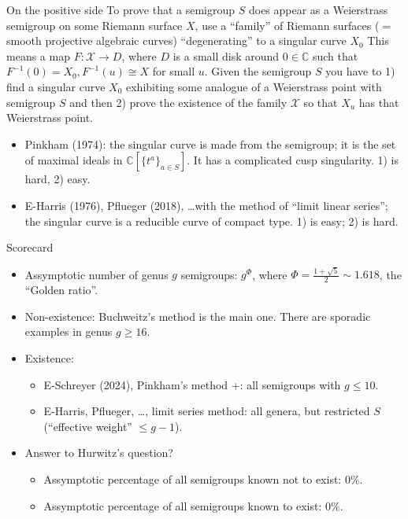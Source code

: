 \documentclass[12pt, aspectratio=169]{beamer}
\begin{document}
\def\C{{\mathbb C}}
\begin{frame}{On the positive side}
To prove that a semigroup $S$ does appear as a Weierstrass semigroup on some
Riemann surface $X$, use a ``family'' of
Riemann surfaces ($=$ smooth projective algebraic curves) ``degenerating'' to a singular curve $X_0$
This means a map $F: \mathcal X \to D$, where $D$ is a small disk around $0\in \C$ such
that $F^{-1}(0) = X_0, F^{-1}(u) \cong X$ for small $u$.
 Given the semigroup $S$ you
have to 1) find a singular curve $X_0$ exhibiting some analogue of a Weierstrass point with semigroup $S$
and then 2) prove the existence of the family $\mathcal X$ so that $X_u$ has that Weierstrass point.

\begin{itemize}
 \item Pinkham (1974): the singular curve is made from the semigroup; it is the set 
of maximal ideals in $\C[\{t^a\}_{a\in S}]$. It has a complicated cusp singularity. 1) is hard, 2) easy.

\item E-Harris (1976), Pflueger (2018), \dots with the method of ``limit linear series''; the singular curve is a reducible curve of compact type. 1) is easy; 2) is hard.
\end{itemize}
\end{frame}

\begin{frame}{Scorecard}\
\begin{itemize}
\item<1-> Assymptotic number of genus $g$ semigroups: $g^\Phi$, where $\Phi = \frac{1+\sqrt 5}{2}\sim 1.618$, the ``Golden ratio''.
 \item<2-> Non-existence: Buchweitz's method is the main one. There are sporadic examples in genus $g \geq 16$.
 \item<3-> Existence: 
\begin{itemize}
 \item<4-> E-Schreyer (2024), Pinkham's method +: all semigroups with $g\leq 10$.
 \item<4-> E-Harris, Pflueger, \dots, limit series method: all genera, but restricted $S$ (``effective weight'' $\leq g-1$).
\end{itemize}
\item<5-> Answer to Hurwitz's question?
\begin{itemize}
  \item<6-> \alert{Assymptotic percentage of all semigroups  known not to exist: 0\%.}
 \item<6-> \alert{Assymptotic percentage of all semigroups  known to exist: 0\%.}
\end{itemize}
 \end{itemize}
\end{frame}
\end{document}

